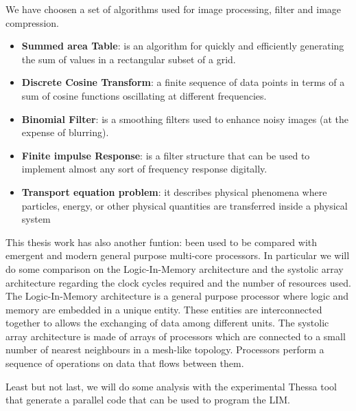 \documentclass[12pt]{report}
\begin{document}
	
	We have choosen a set of algorithms used for image processing, filter and image compression.\\
	\begin{itemize}
		\item \textbf{Summed area Table}: is an algorithm for quickly and efficiently generating the sum of values in a rectangular subset of a grid.
		\item \textbf{Discrete Cosine Transform}: a finite sequence of data points in terms of a sum of cosine functions oscillating at different frequencies.
		\item \textbf{Binomial Filter}: is a smoothing filters used to enhance noisy images (at the expense of blurring).
		\item \textbf{Finite impulse Response}: is a filter structure that can be used to implement almost any sort of frequency response digitally.
		\item \textbf{Transport equation problem}: it describes physical phenomena where particles, energy, or other physical quantities are transferred inside a physical system
		
			\end{itemize}
	
	

\vspace{1cm}	
This thesis work has also another funtion: been used to be compared with emergent and modern general purpose multi-core processors.
In particular we will do some comparison on the Logic-In-Memory architecture and the systolic array architecture regarding the clock cycles required and the number of resources used.\\
The Logic-In-Memory architecture is a general purpose processor where logic and memory are embedded in a unique entity. These entities are interconnected together to allows the exchanging of data among different units.
The systolic array architecture is made of arrays of processors which are connected to a small number of nearest neighbours in a mesh-like topology. Processors perform a sequence of operations on data that flows between them.
\vspace{1cm}

Least but not last, we will do some analysis with the experimental Thessa tool that  generate a parallel code that can be used to program the LIM.\\
 	
	 
	
\end{document}
